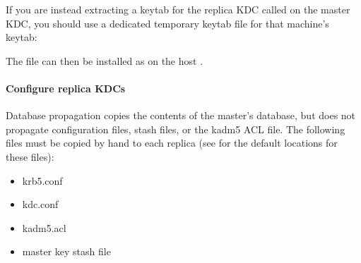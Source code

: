 \documentclass[letterpaper,10pt,english]{sphinxmanual}
\begin{document}
If you are instead extracting a keytab for the replica KDC called
 on the master KDC, you should use a dedicated
temporary keytab file for that machine’s keytab:

%
\begin{sphinxVerbatim}[commandchars=\\\{\}]
    
       
         
       
         
\end{sphinxVerbatim}

The file  can then be installed as
 on the host .


\paragraph{Configure replica KDCs}
\label{\detokenize{admin/install_kdc:configure-replica-kdcs}}
Database propagation copies the contents of the master’s database, but
does not propagate configuration files, stash files, or the kadm5 ACL
file.  The following files must be copied by hand to each replica (see
{\hyperref[\detokenize{mitK5defaults:mitk5defaults}]{}} for the default locations for these files):
\begin{itemize}
\item {} 
krb5.conf

\item {} 
kdc.conf

\item {} 
kadm5.acl

\item {} 
master key stash file

\end{itemize}
\end{document}

